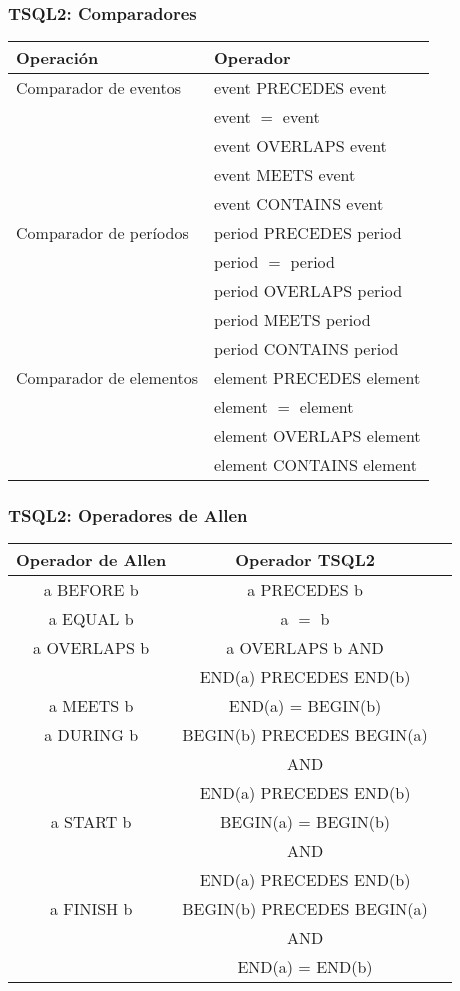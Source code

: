 \documentclass[12pt]{beamer}
\begin{document}
\begin{frame}
\frametitle{TSQL2: Comparadores}
\begin{tabular}{|l|l|}
\hline
Operaci\'on & Operador\\
\hline
\hline
Comparador de eventos & event PRECEDES event\\
& event $=$ event\\
& event OVERLAPS event\\
& event MEETS event\\
& event CONTAINS event\\
\hline
Comparador de per\'iodos & period PRECEDES period\\
& period $=$ period\\
& period OVERLAPS period\\
& period MEETS period\\
& period CONTAINS period\\
\hline
Comparador de elementos & element PRECEDES element\\
& element $=$ element\\
& element OVERLAPS element\\
& element CONTAINS element\\
\hline
\end{tabular}
\end{frame}

\begin{frame}
\frametitle{TSQL2: Operadores de Allen}
\begin{small}
\begin{tabular}{| c | c | c |}
\hline
Operador de Allen & Operador TSQL2\\
\hline
\hline
a BEFORE b & a PRECEDES b\\
\hline
a EQUAL b & a $=$ b\\
\hline
a OVERLAPS b & a OVERLAPS b AND \\ & END(a) PRECEDES END(b)\\
\hline
a MEETS b & END(a) = BEGIN(b)\\
\hline
a DURING b & BEGIN(b) PRECEDES BEGIN(a)\\
& AND\\
& END(a) PRECEDES END(b)\\
\hline
a START b & BEGIN(a) = BEGIN(b)\\
& AND\\
& END(a) PRECEDES END(b)\\
\hline
a FINISH b & BEGIN(b) PRECEDES BEGIN(a)\\
& AND\\
& END(a) = END(b)\\
\hline
\end{tabular}
\end{small}
\end{frame}
\end{document}
